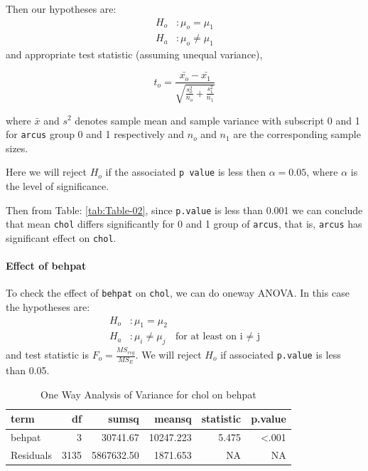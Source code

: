 \documentclass[
  12pt,
  oneside]{article}
\begin{document}
Then our hypotheses are:
\begin{align*}
H_o&: \mu_o = \mu_1 \\
H_a&: \mu_o \neq \mu_1
\end{align*}
and appropriate test statistic (assuming unequal variance),

\[
t_o = \frac{\bar{x_o} - \bar{x_1}}{\sqrt{\frac{s_o^2}{n_o} + \frac{s_1^2}{n_1}}}
\]

where \(\bar{x}\) and \(s^2\) denotes sample mean and sample variance with subscript
0 and 1 for \texttt{arcus} group 0 and 1 respectively and \(n_o\) and \(n_1\) are the corresponding sample sizes.

Here we will reject \(H_o\) if the associated \texttt{p\ value} is less then \(\alpha = 0.05\), where \(\alpha\) is the level of significance.

Then from Table: \ref{tab:Table-02}, since \texttt{p.value} is less than 0.001 we can conclude that mean \texttt{chol} differs significantly for 0 and 1 group of \texttt{arcus}, that is, \texttt{arcus} has significant effect on \texttt{chol}.

\hypertarget{effect-of-behpat}{%
\paragraph{Effect of behpat}\label{effect-of-behpat}}

To check the effect of \texttt{behpat} on \texttt{chol}, we can do oneway ANOVA. In this case the hypotheses are:
\begin{align*}
H_o&: \mu_1 = \mu_2 \\
H_a&: \mu_i \neq \mu_j \! &\text{for at least on i $\ne$ j}
\end{align*}
and test statistic is \(F_o = \frac{MS_{reg}}{MS_{E}}\). We will reject \(H_o\) if associated \texttt{p.value} is less than 0.05.

\begin{table}[H]

\caption{\label{tab:Table-03}One Way Analysis of Variance for chol on behpat}
\centering
\begin{tabular}[t]{lrrrrr}
\toprule
term & df & sumsq & meansq & statistic & p.value\\
\midrule
behpat & 3 & 30741.67 & 10247.223 & 5.475 & <.001\\
Residuals & 3135 & 5867632.50 & 1871.653 & NA & NA\\
\bottomrule
\end{tabular}
\end{table}
\end{document}
